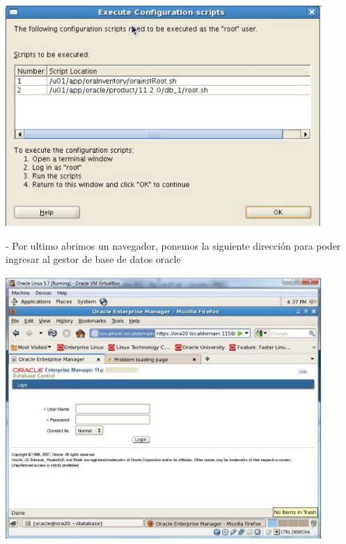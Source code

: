 \documentclass[12pt,letterpaper]{article}
\begin{document}
\begin{center}
	\includegraphics[width=12cm]{./Imagenes/34} 
\end{center}


\begin{itemize}
- Por ultimo abrimos un navegador, ponemos la siguiente dirección para poder ingresar al gestor de base de datos oracle \\
\end{itemize}

\begin{center}
	\includegraphics[width=12cm]{./Imagenes/35} 
\end{center}
\end{document}
